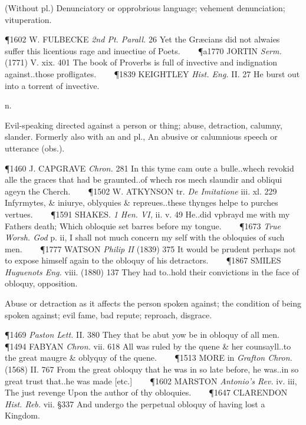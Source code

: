 \begin{description}[wide, labelwidth=!, labelindent=0pt]
\begin{myenumerate}
 (Without pl.) Denunciatory or opprobrious language; vehement denunciation; vituperation.

\P 1602 W. FULBECKE  \textit{2nd Pt. Parall.} 26 Yet the Græcians did not alwaies suffer this licentious rage and inuectiue of Poets.    
\P a1770 JORTIN  \textit{Serm.} (1771) V. xix. 401 The book of Proverbs is full of invective and indignation against..those profligates.    
\P 1839 KEIGHTLEY  \textit{Hist. Eng.} II. 27 He burst out into a torrent of invective.
\end{myenumerate}


 n.

\noindent {}

\vspace{-0.3cm}

\begin{myenumerate}

 Evil-speaking directed against a person or thing; abuse, detraction, calumny, slander. Formerly also with an and pl., An abusive or calumnious speech or utterance (obs.).

\P 1460 J. CAPGRAVE  \textit{Chron.} 281 In this tyme cam oute a bulle..whech revokid alle the graces that had be graunted..of whech ros mech slaundir and obliqui ageyn the Cherch.    
\P 1502 W. ATKYNSON tr.  \textit{De Imitatione} iii. xl. 229 Infyrmytes, \& iniurye, oblyquies \& repreues..these thynges helpe to purches vertues.    
\P 1591 SHAKES.  \textit{1 Hen. VI,} ii. v. 49 He..did vpbrayd me with my Fathers death; Which obloquie set barres before my tongue.    
\P 1673  \textit{True Worsh. God} p. ii, I shall not much concern my self with the obloquies of such men.    
\P 1777 WATSON  \textit{Philip II} (1839) 375 It would be prudent perhaps not to expose himself again to the obloquy of his detractors.    
\P 1867 SMILES  \textit{Huguenots Eng.} viii. (1880) 137 They had to..hold their convictions in the face of obloquy, opposition.

 Abuse or detraction as it affects the person spoken against; the condition of being spoken against; evil fame, bad repute; reproach, disgrace.

\P 1469  \textit{Paston Lett.} II. 380 They that be abut yow be in obloquy of all men.    
\P 1494 FABYAN \textit{Chron.} vii. 618 All was ruled by the quene \& her counsayll..to the great maugre \& oblyquy of the quene.    
\P 1513 MORE in  \textit{Grafton Chron.} (1568) II. 767 From the great obloquy that he was in so late before, he was..in so great trust that..he was made [etc.]    
\P 1602 MARSTON  \textit{Antonio's Rev.} iv. iii, The just revenge Upon the author of thy obloquies.    
\P 1647 CLARENDON  \textit{Hist. Reb.} vii. §337 And undergo the perpetual obloquy of having lost a Kingdom.


\end{myenumerate}
\end{description}
